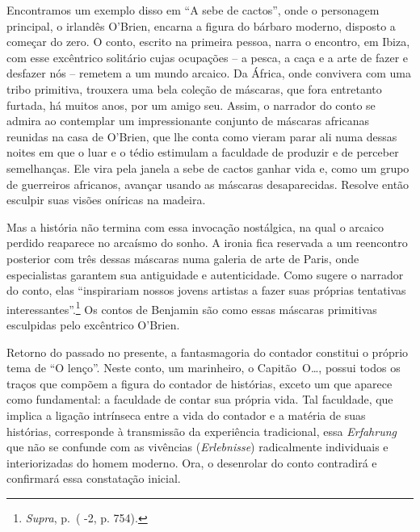Encontramos um exemplo disso em ``A sebe de cactos'', onde o personagem
principal, o irlandês O'Brien, encarna a figura do bárbaro moderno,
disposto a começar do zero. O conto, escrito na primeira pessoa, narra o
encontro, em Ibiza, com esse excêntrico solitário cujas ocupações -- a
pesca, a caça e a arte de fazer e desfazer nós -- remetem a um mundo
arcaico. Da África, onde convivera com uma tribo primitiva, trouxera uma
bela coleção de máscaras, que fora entretanto furtada, há muitos anos,
por um amigo seu. Assim, o narrador do conto se admira ao contemplar um
impressionante conjunto de máscaras africanas reunidas na casa de
O'Brien, que lhe conta como vieram parar ali numa dessas noites em que o
luar e o tédio estimulam a faculdade de produzir e de perceber
semelhanças. Ele vira pela janela a sebe de cactos ganhar vida e, como
um grupo de guerreiros africanos, avançar usando as máscaras
desaparecidas. Resolve então esculpir suas visões oníricas na madeira.

Mas a história não termina com essa invocação nostálgica, na qual o
arcaico perdido reaparece no arcaísmo do sonho. A ironia fica reservada
a um reencontro posterior com três dessas máscaras numa galeria de arte
de Paris, onde especialistas garantem sua antiguidade e autenticidade.
Como sugere o narrador do conto, elas ``inspirariam nossos jovens artistas a
fazer suas próprias tentativas interessantes''.\footnote{\emph{Supra},
  p.\,\pageref{supra8} ( -2, p. 754).} Os contos de Benjamin são como essas máscaras
primitivas esculpidas pelo excêntrico O'Brien.

Retorno do passado no presente, a fantasmagoria do contador constitui o
próprio tema de ``O lenço''. Neste conto, um marinheiro, o Capitão~O\ldots{},
possui todos os traços que compõem a figura do contador de histórias,
exceto um que aparece como fundamental: a faculdade de contar sua
própria vida. Tal faculdade, que implica a ligação intrínseca entre a
vida do contador e a matéria de suas histórias, corresponde à
transmissão da experiência tradicional, essa \emph{Erfahrung} que não se
confunde com as vivências (\emph{Erlebnisse}) radicalmente individuais e
interiorizadas do homem moderno. Ora, o desenrolar do conto contradirá e
confirmará essa constatação inicial.

